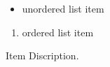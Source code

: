 
\begin{itemize}
    \item unordered list item
\end{itemize}

\begin{enumerate}
    \item ordered list item
\end{enumerate}

\begin{description}[labelindent=\parindent, leftmargin=0em]
    \item[Discription Title] Item Discription.
\end{description}
